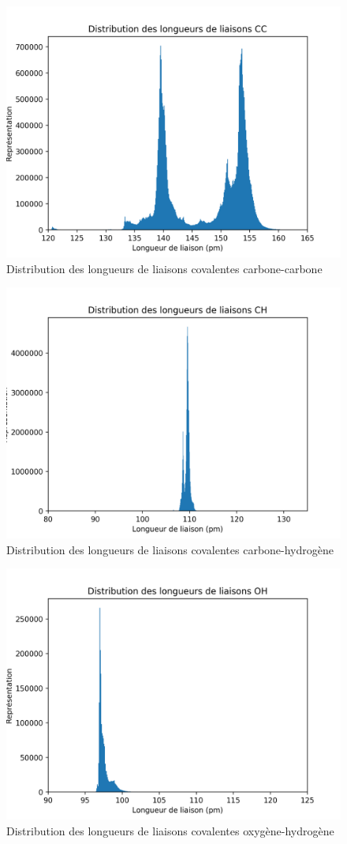 \begin{figure}
	\centering
	\includegraphics[scale=0.7]{../figures/distribCC.png}
	\caption{Distribution des longueurs de liaisons covalentes carbone-carbone}
\end{figure}

\begin{figure}
	\centering
	\includegraphics[scale=0.7]{../figures/distribCH.png}
	\caption{Distribution des longueurs de liaisons covalentes carbone-hydrogène}
\end{figure}

\begin{figure}
	\centering
	\includegraphics[scale=0.7]{../figures/distribOH.png}
	\caption{Distribution des longueurs de liaisons covalentes oxygène-hydrogène}
\end{figure}